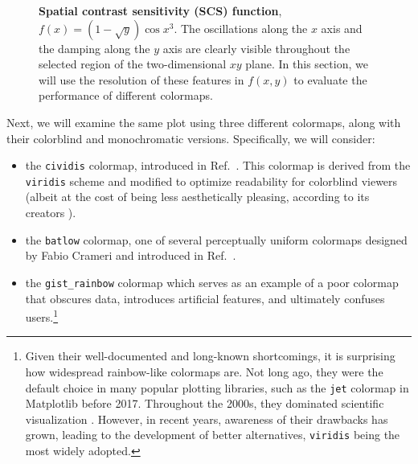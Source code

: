 \begin{figure}
\captionsetup{format = sidebyside, indention = 0cm} 
\begin{minipage}[t]{0.4\textwidth}
	\vspace{-5pt}
	\caption{\textbf{Spatial contrast sensitivity (SCS) function},  $f(x)= \left(1 - \sqrt{y} \right)  \cos x^3$. The oscillations along the $x$ axis and the damping along the $y$ axis are clearly visible throughout the selected region of the two-dimensional $xy$ plane. In this section, we will use the resolution of these features in $f(x,y)$ to evaluate the performance of different colormaps.}
	\label{fig:sensitivityfunction}
\end{minipage}\hfill 
\begin{minipage}[t]{0.55\textwidth}
	\centering 
	\vspace{0pt}
	
\end{minipage}
\end{figure} 

Next, we will examine the same plot using three different colormaps, along with their colorblind and monochromatic versions. Specifically, we will consider:
\begin{itemize}
\item the \verb|cividis| colormap, introduced in Ref.~\cite{nunez2018}. This colormap is derived from the \verb|viridis| scheme and modified to optimize readability for colorblind viewers (albeit at the cost of being less aesthetically pleasing, according to its creators \cite{nunez2018}).
\item the \verb|batlow| colormap, one of several perceptually uniform colormaps designed by Fabio Crameri and introduced in Ref.~\cite{crameri2020}.
\item the \verb|gist_rainbow| colormap  which serves as an example of a poor colormap that obscures data, introduces artificial features, and ultimately confuses users.\footnote{Given their well-documented and long-known shortcomings, it is surprising how widespread rainbow-like colormaps are. 
Not long ago, they were the default choice in many popular plotting libraries, such as the \texttt{jet} colormap in Matplotlib before 2017. Throughout the 2000s, they dominated scientific visualization \cite{borland2007}. However, in recent years, awareness of their drawbacks has grown, leading to the development of better alternatives, \texttt{viridis} being the most widely adopted.}
\end{itemize}

